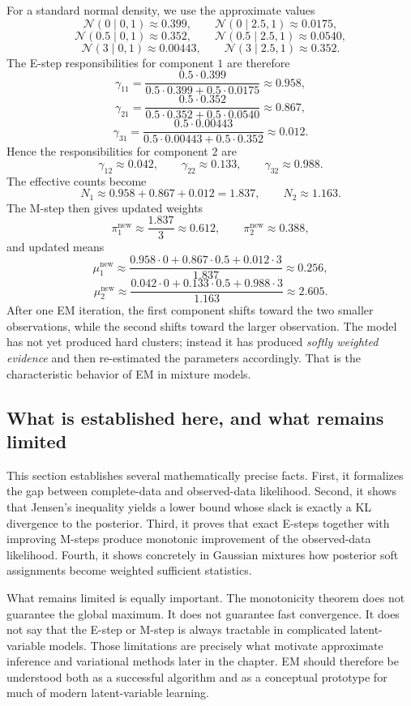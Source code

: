 For a standard normal density, we use the approximate values
\[
\mathcal{N}(0\mid 0,1)\approx 0.399,
\qquad
\mathcal{N}(0\mid 2.5,1)\approx 0.0175,
\]
\[
\mathcal{N}(0.5\mid 0,1)\approx 0.352,
\qquad
\mathcal{N}(0.5\mid 2.5,1)\approx 0.0540,
\]
\[
\mathcal{N}(3\mid 0,1)\approx 0.00443,
\qquad
\mathcal{N}(3\mid 2.5,1)\approx 0.352.
\]
The E-step responsibilities for component $1$ are therefore
\[
\gamma_{11}
=
\frac{0.5\cdot 0.399}{0.5\cdot 0.399 + 0.5\cdot 0.0175}
\approx 0.958,
\]
\[
\gamma_{21}
=
\frac{0.5\cdot 0.352}{0.5\cdot 0.352 + 0.5\cdot 0.0540}
\approx 0.867,
\]
\[
\gamma_{31}
=
\frac{0.5\cdot 0.00443}{0.5\cdot 0.00443 + 0.5\cdot 0.352}
\approx 0.012.
\]
Hence the responsibilities for component $2$ are
\[
\gamma_{12}\approx 0.042,
\qquad
\gamma_{22}\approx 0.133,
\qquad
\gamma_{32}\approx 0.988.
\]
The effective counts become
\[
N_1 \approx 0.958+0.867+0.012 = 1.837,
\qquad
N_2 \approx 1.163.
\]
The M-step then gives updated weights
\[
\pi_1^{\mathrm{new}}\approx \frac{1.837}{3}\approx 0.612,
\qquad
\pi_2^{\mathrm{new}}\approx 0.388,
\]
and updated means
\[
\mu_1^{\mathrm{new}}
\approx
\frac{0.958\cdot 0 + 0.867\cdot 0.5 + 0.012\cdot 3}{1.837}
\approx 0.256,
\]
\[
\mu_2^{\mathrm{new}}
\approx
\frac{0.042\cdot 0 + 0.133\cdot 0.5 + 0.988\cdot 3}{1.163}
\approx 2.605.
\]
After one EM iteration, the first component shifts toward the two smaller observations, while the second shifts toward the larger observation.
The model has not yet produced hard clusters; instead it has produced \emph{softly weighted evidence} and then re-estimated the parameters accordingly.
That is the characteristic behavior of EM in mixture models.

\subsection*{What is established here, and what remains limited}

This section establishes several mathematically precise facts.
First, it formalizes the gap between complete-data and observed-data likelihood.
Second, it shows that Jensen's inequality yields a lower bound whose slack is exactly a KL divergence to the posterior.
Third, it proves that exact E-steps together with improving M-steps produce monotonic improvement of the observed-data likelihood.
Fourth, it shows concretely in Gaussian mixtures how posterior soft assignments become weighted sufficient statistics.

\medskip

\noindent
What remains limited is equally important.
The monotonicity theorem does not guarantee the global maximum.
It does not guarantee fast convergence.
It does not say that the E-step or M-step is always tractable in complicated latent-variable models.
Those limitations are precisely what motivate approximate inference and variational methods later in the chapter.
EM should therefore be understood both as a successful algorithm and as a conceptual prototype for much of modern latent-variable learning.

